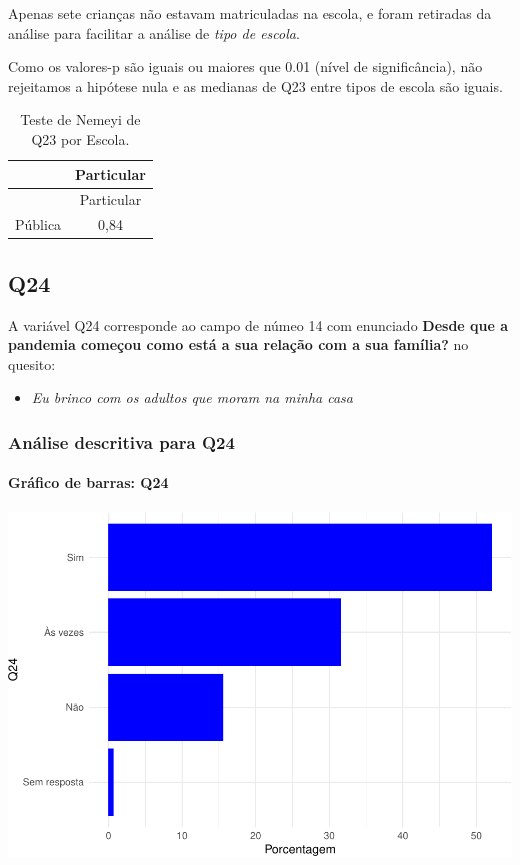 \documentclass[]{article}
\providecommand{\tightlist}{%
  \setlength{\itemsep}{0pt}\setlength{\parskip}{0pt}}
\let\oldparagraph\paragraph
\renewcommand{\paragraph}[1]{\oldparagraph{#1}\mbox{}}
\begin{document}
Apenas sete crianças não estavam matriculadas na escola, e foram retiradas da análise para facilitar a análise de \emph{tipo de escola}.

Como os valores-p são iguais ou maiores que 0.01 (nível de significância), não rejeitamos a hipótese nula e as medianas de Q23 entre tipos de escola são iguais.

\begin{longtable}[]{@{}lc@{}}
\caption{\label{tab:unnamed-chunk-593}Teste de Nemeyi de Q23 por Escola.}\tabularnewline
\toprule
& Particular\tabularnewline
\midrule
\endfirsthead
\toprule
& Particular\tabularnewline
\midrule
\endhead
Pública & 0,84\tabularnewline
\bottomrule
\end{longtable}

\cleardoublepage

\hypertarget{q24}{%
\subsection{Q24}\label{q24}}

A variável Q24 corresponde ao campo de númeo 14 com enunciado \textbf{Desde que a pandemia começou como está a sua relação com a sua família?} no quesito:

\begin{itemize}
\tightlist
\item
  \emph{Eu brinco com os adultos que moram na minha casa}
\end{itemize}

\hypertarget{anuxe1lise-descritiva-para-q24}{%
\subsubsection{Análise descritiva para Q24}\label{anuxe1lise-descritiva-para-q24}}

\hypertarget{gruxe1fico-de-barras-q24}{%
\paragraph{Gráfico de barras: Q24}\label{gruxe1fico-de-barras-q24}}

\begin{center}\includegraphics[width=0.75\linewidth]{relatorio_covid19_files/figure-latex/unnamed-chunk-600-1} \end{center}
\end{document}
